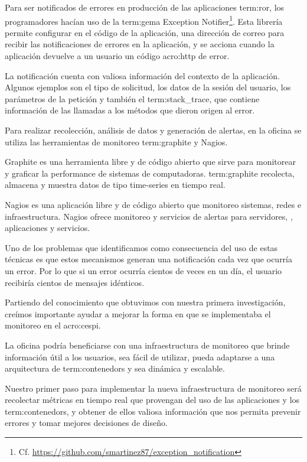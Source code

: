 Para ser notificados de errores en producción de las aplicaciones
\gls{term:ror}, los programadores hacían uso de la \gls{term:gema} Exception
Notifier\footnote{Cf.
\url{https://github.com/smartinez87/exception_notification}}. Esta librería
permite configurar en el código de la aplicación, una dirección de correo para
recibir las notificaciones de errores en la aplicación, y se acciona cuando la
aplicación devuelve a un usuario un código \gls{acro:http} de error.

La notificación cuenta con valiosa información del contexto de la aplicación.
Algunos ejemplos son el tipo de solicitud, los datos de la sesión del usuario,
los parámetros de la petición y también el \gls{term:stack_trace}, que contiene
información de las llamadas a los métodos que dieron origen al error.

Para realizar recolección, análisis de datos y generación de alertas, en la
oficina se utiliza las herramientas de monitoreo \gls{term:graphite} y Nagios.

Graphite es una herramienta libre y de código abierto que sirve para monitorear
y graficar la performance de sistemas de computadoras. \gls{term:graphite} recolecta,
almacena y muestra datos de tipo time-series en tiempo real.

Nagios es una aplicación libre y de código abierto que monitoreo sistemas,
redes e infraestructura. Nagios ofrece monitoreo y servicios de alertas para
servidores, , aplicaciones y servicios.

Uno de los problemas que identificamos como consecuencia del uso de estas
técnicas es que estos mecanismos generan una notificación cada vez que ocurría
un error. Por lo que si un error ocurría cientos de veces en un día, el usuario
recibiría cientos de mensajes idénticos.

Partiendo del conocimiento que obtuvimos con nuestra primera investigación,
creímos importante ayudar a mejorar la forma en que se implementaba el
monitoreo en el \gls{acro:cespi}.

La oficina podría beneficiarse con una infraestructura de monitoreo que brinde
información útil a los usuarios, sea fácil de utilizar, pueda adaptarse a una
arquitectura de \glspl{term:contenedor} y sea dinámica y escalable.

Nuestro primer paso para implementar la nueva infraestructura de monitoreo será
recolectar métricas en tiempo real que provengan del uso de las aplicaciones y
los \glspl{term:contenedor}, y obtener de ellos valiosa información que nos
permita prevenir errores y tomar mejores decisiones de diseño.

